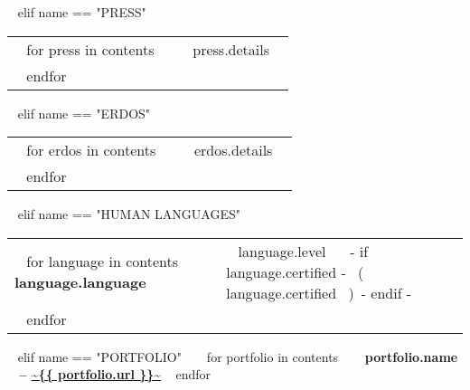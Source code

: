\begin{minipage}{\textwidth}
~{ elif name == "PRESS" }~

\begin{tabular}{ @{} p{32mm} p{135mm} @{} }
  ~{ for press in contents }~
  \small \textcolor{gray}{{\emph{ }}} & {\small ~{{ press.details }}~} \\
  ~{ endfor }~
\end{tabular}


~{ elif name == "ERDOS" }~

\begin{tabular}{ @{} p{32mm} p{135mm} @{} }
  ~{ for erdos in contents }~
  \small \textcolor{gray}{{\emph{ }}} & {\small ~{{ erdos.details }}~} \\
  ~{ endfor }~
\end{tabular}



~{ elif name == "HUMAN LANGUAGES" }~
  \begin{tabular}{ @{} p{32mm} p{135mm} @{} }
  ~{ for language in contents }~
    \bf {~{{ language.language }}~} & {\small ~{{ language.level }}~ ~{- if language.certified -}~ \small\color{maingrey}\hspace{1mm}(~{{ language.certified }}~)~{- endif -}~} \\
  ~{ endfor }~
  \end{tabular}
  \vspace{50mm}


~{ elif name == "PORTFOLIO" }~
  ~{ for portfolio in contents }~
    {\bf ~{{ portfolio.name }}~ -- \color{maincolor}\url{~{{ portfolio.url }}~} }
    \vspace{1mm}
  ~{ endfor }~
  \vspace{5mm}


\end{minipage}
